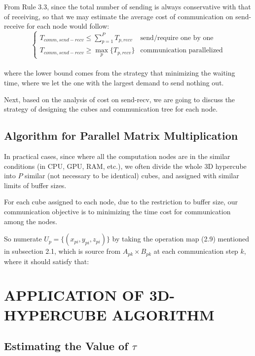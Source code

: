 \documentclass{amsart}
\theoremstyle{definition}
\theoremstyle{remark}
\numberwithin{equation}{section}
\begin{document}
\par
	From Rule 3.3, since the total number of sending is always conservative with that of receiving, so that we may estimate the average cost of communication on send-receive for each node would follow: 
\begin{equation}
\left\{
	\begin{array}{ll}  
          T_{comm,send-recv}\le\sum_{p=1}^{P}T_{p,recv}  & \text{send/require one by one}\\ 
          T_{comm,send-recv}\ge\max \limits_{p}\{T_{p,recv}\} & \text{communication parallelized}
	\end{array}
\right.
\end{equation}
\\
where the lower bound comes from the strategy that minimizing the waiting time, where we let the one with the largest demand to send nothing out.\par
	Next, based on the analysis of cost on send-recv, we are going to discuss the strategy of designing the cubes and communication tree for each node.

\subsection{Algorithm for Parallel Matrix Multiplication}
	In practical cases, since where all the computation nodes are in the similar conditions (in CPU, GPU, RAM, etc.), we often divide the whole 3D hypercube into $P$ similar (not necessary to be identical) cubes, and assigned with similar limits of buffer sizes.\par
	For each cube assigned to each node, due to the restriction to buffer size, our communication objective is to minimizing the time cost for communication among the nodes.\par
	So numerate $U_p=\{(x_{pi},y_{pi},z_{pi})\}$ by taking the operation map (2.9) mentioned in subsection 2.1, which is source from $A_{pk}\times B_{pk}$ at each communication step $k$, where it should satisfy that:\par


\section{APPLICATION OF 3D-HYPERCUBE ALGORITHM}
	
\subsection{Estimating the Value of $\tau$}
		
\end{document}

